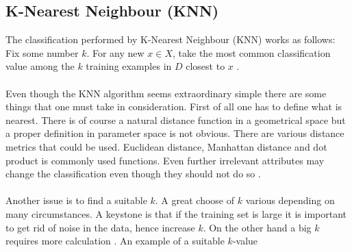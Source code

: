 \subsection{K-Nearest Neighbour (KNN)}
The classification performed by K-Nearest Neighbour (KNN) works as follows: Fix some number $k$. For any new $x \in X$, take the most common classification value among the $k$ training examples in $D$ closest to $x$ \cite{ml_2011}.
\\\\
Even though the KNN algorithm seems extraordinary simple there are some things that one must take in consideration. 
First of all one has to define what is nearest. There is of course a natural distance function in a geometrical space but a proper definition in parameter space is not obvious.
There are various distance metrics that could be used. Euclidean distance, Manhattan distance and dot product is commonly used functions. 
Even further irrelevant attributes may change the classification even though they
should not do so \cite{ml_2011}. 
\\\\
Another issue is to find a suitable $k$. A great choose of $k$ various
depending on many circumstances. A keystone is that if the training set is large
it is important to get rid of noise in the data, hence increase $k$. On the other
hand a big $k$ requires more calculation \cite{ml_2011}. An example of a suitable $k$-value 
